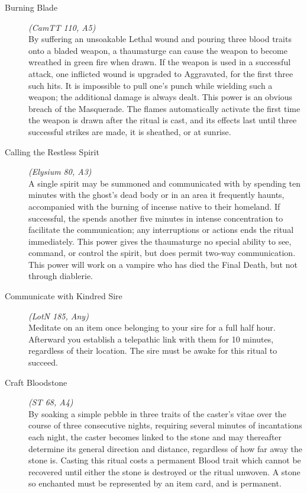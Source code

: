 \begin{description}
	\item[Burning Blade] \emph{(CamTT 110, A5)} \hfill \\
	By suffering an unsoakable Lethal wound and pouring three blood traits onto a bladed weapon, a thaumaturge can cause 
	the weapon to become wreathed in green fire when drawn. If the weapon is used in a successful attack, one inflicted 
	wound is upgraded to Aggravated, for the first three such hits. It is impossible to pull one's punch while wielding 
	such a weapon; the additional damage is always dealt. This power is an obvious breach of the Masquerade. The flames 
	automatically activate the first time the weapon is drawn after the ritual is cast, and its effects last until three 
	successful strikes are made, it is sheathed, or at sunrise. \\

	\item[Calling the Restless Spirit] \emph{(Elysium 80, A3)} \hfill \\
	A single spirit may be summoned and communicated with by spending ten minutes with the ghost's dead body or in an 
	area it frequently haunts, accompanied with the burning of incense native to their homeland.  If successful, the 
	spends another five minutes in intense concentration to facilitate the communication; any interruptions or actions 
	ends the ritual immediately.  This power gives the thaumaturge no special ability to see, command, or control the 
	spirit, but does permit two-way communication.  This power will work on a vampire who has died the Final Death, but 
	not through diablerie. \\

	\item[Communicate with Kindred Sire] \emph{(LotN 185, Any)} \hfill \\
	Meditate on an item once belonging to your sire for a full half hour. Afterward you establish a telepathic link 
	with them for 10 minutes, regardless of their location. The sire must be awake for this ritual to succeed. \\

	\item[Craft Bloodstone] \emph{(ST 68, A4)} \hfill \\
	By soaking a simple pebble in three traits of the caster's vitae over the course of three consecutive nights, 
	requiring several minutes of incantations each night, the caster becomes linked to the stone and may thereafter 
	determine its general direction and distance, regardless of how far away the stone is. Casting this ritual costs 
	a permanent Blood trait which cannot be recovered until either the stone is destroyed or the ritual unwoven. A 
	stone so enchanted must be represented by an item card, and is permanent. \\


\end{description}
